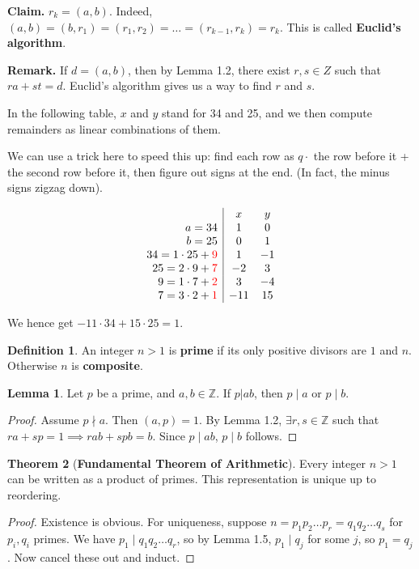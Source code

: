 \documentclass{article}
\theoremstyle{definition}
\newtheorem{theorem}{Theorem}[section]
\newtheorem{lemma}[theorem]{Lemma}
\newtheorem{defn}{Definition}[section]
\begin{document}
\textbf{Claim.} 
    $r_k = (a,b)$.
Indeed, $(a,b) = (b, r_1) = (r_1, r_2) = \ldots = (r_{k-1}, r_k) = r_k$. This is called \textbf{Euclid's algorithm}.

\textbf{Remark.} If $d = (a,b)$, then by Lemma 1.2, there exist $r,s \in Z$ such that $ra + st = d$. Euclid's algorithm gives us a way to find $r$ and $s$.

\vspace{3mm}


In the following table, $x$ and $y$ stand for 34 and 25, and we then compute remainders as linear combinations of them.

We can use a trick here to speed this up: find each row as $q \cdot$ the row before it + the second row before it, then figure out signs at the end. (In fact, the minus signs zigzag down).

\begin{equation*}
    \begin{array}{r|cc}
        & x & y \\
        a=34 & 1 & 0 \\
        b=25 & 0 & 1 \\
        34 = 1 \cdot 25 + \color{red}{9}& 1 & -1 \\
        25 = 2 \cdot 9 + \color{red}{7}& -2 & 3 \\
        9 = 1 \cdot 7 + \color{red}{2}& 3 & -4 \\
        7 = 3 \cdot 2 + \color{red}{1}& -11 & 15 \\
    \end{array}
\end{equation*}

We hence get $-11 \cdot 34 + 15 \cdot 25 = 1$.

\begin{defn}
    An integer $n>1$ is \textbf{prime} if its only positive divisors are $1$ and $n$. Otherwise $n$ is \textbf{composite}.
\end{defn}
\begin{lemma} %
    Let $p$ be a prime, and $a,b \in \mathbb{Z}$. If $p | ab$, then $p \mid a$ or $p \mid b$.
\end{lemma}
\begin{proof}
    Assume $p \nmid a$. Then $(a,p) = 1$. By Lemma 1.2, $\exists r,s \in \mathbb{Z}$ such that $ra + sp = 1 \implies rab + spb = b$. Since $p \mid ab$, $p \mid b$ follows.
\end{proof}

\begin{theorem}[\textbf{Fundamental Theorem of Arithmetic}] 
    Every integer ${n>1}$ can be written as a product of primes. This representation is unique up to reordering.
\end{theorem}
\begin{proof}
    Existence is obvious. For uniqueness, suppose $n = p_1p_2 \ldots p_r = q_1 q_2 \ldots q_s$ for $p_i, q_i$ primes. We have $p_1 \mid q_1 q_2 \ldots q_r$, so by Lemma 1.5, $p_1 \mid q_j$ for some $j$, so $p_1 = q_j$. Now cancel these out and induct.
\end{proof}
\end{document}
